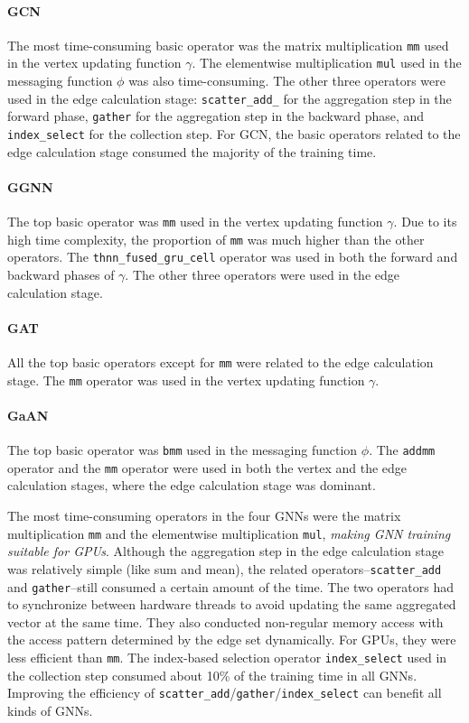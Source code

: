 \paragraph{GCN}
%
The most time-consuming basic operator was the matrix multiplication \texttt{mm} used in the vertex updating function $\gamma$.
%
The elementwise multiplication \texttt{mul} used in the messaging function $\phi$ was also time-consuming.
%
The other three operators were used in the edge calculation stage: \texttt{scatter\_add\_} for the aggregation step in the forward phase, \texttt{gather} for the aggregation step in the backward phase, and \texttt{index\_select} for the collection step.
%
For GCN, the basic operators related to the edge calculation stage consumed the majority of the training time.

\paragraph{GGNN}
%
The top basic operator was \texttt{mm} used in the vertex updating function $\gamma$.
%
Due to its high time complexity, the proportion of \texttt{mm} was much higher than the other operators.
%
The \texttt{thnn\_fused\_gru\_cell} operator was used in both the forward and backward phases of $\gamma$.
%
The other three operators were used in the edge calculation stage.

\paragraph{GAT}
%
All the top basic operators except for \texttt{mm} were related to the edge calculation stage.
%
The \texttt{mm} operator was used in the vertex updating function $\gamma$.

\paragraph{GaAN}
%
The top basic operator was \texttt{bmm} used in the messaging function $\phi$.
%
The \texttt{addmm} operator and the \texttt{mm} operator were used in both the vertex and the edge calculation stages, where the edge calculation stage was dominant.

The most time-consuming operators in the four GNNs were the matrix multiplication \texttt{mm} and the elementwise multiplication \texttt{mul}, \emph{making GNN training suitable for GPUs}.
%
Although the aggregation step in the edge calculation stage was relatively simple (like sum and mean), the related operators--\texttt{scatter\_add} and \texttt{gather}--still consumed a certain amount of the time.
%
The two operators had to synchronize between hardware threads to avoid updating the same aggregated vector at the same time.
%
They also conducted non-regular memory access with the access pattern determined by the edge set dynamically.
%
For GPUs, they were less efficient than \texttt{mm}.
%
The index-based selection operator \texttt{index\_select} used in the collection step consumed about 10\% of the training time in all GNNs.
%
Improving the efficiency of \texttt{scatter\_add}/\texttt{gather}/\texttt{index\_select} can benefit all kinds of GNNs.

